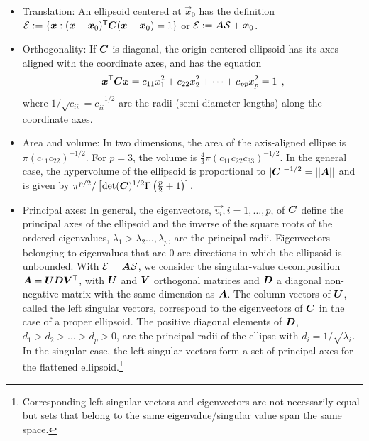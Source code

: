 \begin{itemize}
 \item Translation: An ellipsoid centered at $\vec{x}_0$ has the definition $\mathcal{E} := \{ \bm{x}: (\bm{x}-\bm{x}_0)^\mathsf{T} \bm{C} (\bm{x}-\bm{x}_0) =1 \}$ or $\mathcal{E} := \bm{A} \mathcal{S} + \bm{x}_0$.

 \item Orthogonality: If $\bm{C}$ is diagonal, the origin-centered ellipsoid has its axes aligned with the coordinate axes, and
has the equation
\begin{equation}\label{eq:ellisoid2}
 \bm{x}^\mathsf{T} \bm{C} \bm{x} = c_{11} x_1^2 + c_{22} x_2^2 + \cdots + c_{pp} x_p^2 =1 \:\: ,
\end{equation}
where $1/\sqrt{c_{ii}} = c_{ii}^{-1/2}$ are the radii (semi-diameter lengths) along the coordinate axes.

 \item Area and volume: In two dimensions, the area of the axis-aligned ellipse is $\pi (c_{11} c_{22})^{-1/2}$.
 For $p=3$, the volume is $\frac{4}{3}\pi (c_{11} c_{22} c_{33})^{-1/2}$.
 In the general case, the hypervolume of the ellipsoid is proportional to $|\bm{C}|^{-1/2}=||\bm{A}||$
 and is given by $\pi^{p/2} / \left[ \mathrm{det} (\bm{C})^{1/2} \Gamma\left(\frac{p}{2}+1\right) \right]$.

 \item Principal axes: In general, the eigenvectors, $\vec{v_i}, i=1,\dots,p$,
of $\bm{C}$ define the principal axes of the ellipsoid and
the inverse of the square roots of the ordered
eigenvalues, $\lambda_1 > \lambda_2 \dots, \lambda_p$, are the principal radii.
Eigenvectors belonging to eigenvalues that are 0 are directions in which the ellipsoid is unbounded.
With $\mathcal{E} = \bm{A} \mathcal{S}$, we consider the singular-value decomposition
$  \bm{A}= \bm{U} \bm{D} \bm{V} ^\mathsf{T}$,
with $\bm{U}$ and  $\bm{V}$ orthogonal matrices and  $\bm{D}$  a diagonal non-negative matrix
with the same dimension as $\bm{A}$.
The column vectors of $\bm{U}$, called the left singular vectors,
correspond to the eigenvectors of $\bm{C}$ in the case of a proper ellipsoid.
The positive diagonal elements of $\bm{D}$, $d_1 > d_2 > ... > d_p>0$,
are the principal radii of the ellipse with $d_i = 1/\sqrt{\lambda_i}$.
In the singular case, the left singular vectors form a set of principal axes for the flattened ellipsoid.\footnote{Corresponding left singular vectors and eigenvectors are not necessarily equal but sets that belong to the same eigenvalue/singular value span the same space.}


\end{itemize}
